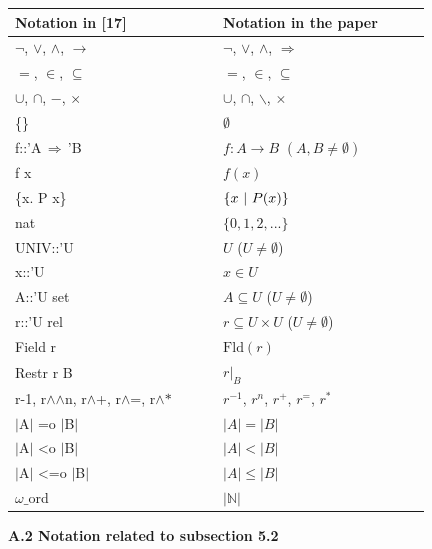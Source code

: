 \begin{longtable}{|p{0.415\linewidth}|p{0.415\linewidth}|}\hline
Notation in [17] & Notation in the paper \\ \hline
$\neg$, $\vee$, $\wedge$, $\longrightarrow$ & $\neg$, $\vee$, $\wedge$, $\Rightarrow$ \\ \hline
$=$, $\in$, $\subseteq$ & $=$, $\in$, $\subseteq$ \\ \hline
$\cup$, $\cap$, $-$, $\times$ & $\cup$, $\cap$, $\backslash$, $\times$ \\ \hline
\{\} & $\emptyset$ \\ \hline
f::’A$\,\Rightarrow\,$’B & $f:A\to B$ $(A,B\neq\emptyset)$ \\ \hline
f x & $f(x)$ \\ \hline
\{x. P x\} & $\{x\leavevmode\nobreak\ |\leavevmode\nobreak\ P(x)\}$ \\ \hline
nat & $\{0,1,2,...\}$ \\ \hline
UNIV::’U & $U$ ($U\neq\emptyset$) \\ \hline
x::’U & $x\in U$ \\ \hline
A::’U set & $A\subseteq U$ ($U\neq\emptyset$) \\ \hline
r::’U rel & $r\subseteq U\times U$ ($U\neq\emptyset$) \\ \hline
Field r & $\mathrm{Fld}(r)$ \\ \hline
Restr r B & $r|_{B}$ \\ \hline
r-1, r\ensuremath{\wedge}\ensuremath{\wedge}n, r\ensuremath{\wedge}+, r\ensuremath{\wedge}=, r\ensuremath{\wedge}\ensuremath{\ast} & $r^{-1}$, $r^{n}$, $r^{+}$, $r^{=}$, $r^{*}$ \\ \hline
$|$A$|$ =o $|$B$|$ & $|A|=|B|$ \\ \hline
$|$A$|$ <o $|$B$|$ & $|A|<|B|$ \\ \hline
$|$A$|$ <=o $|$B$|$ & $|A|\leq|B|$ \\ \hline
$\omega\_$ord & $|\mathbb{N}|$ \\ \hline
\end{longtable}
 
 
 
 
\par\medskip\noindent\textbf{A.2 Notation related to subsection 5.2}\par
 
 

